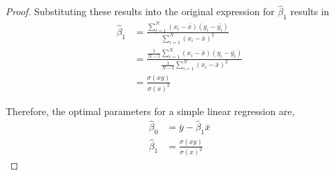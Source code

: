 \begin{proof}
Substituting these results into the original expression for $\hat{\beta}_1$ results in
\begin{align*}
\hat{\beta}_1   &= \frac{\sum_{i=1}^{N}(x_i-\bar{x})(y_i-\bar{y_i})}{\sum_{i=1}^{N}(x_i-\bar{x})^2}\\
    &= \frac{\frac{1}{N-1}\sum_{i=1}^{N}(x_i-\bar{x})(y_i-\bar{y_i})}{\frac{1}{N-1}\sum_{i=1}^{N}(x_i-\bar{x})^2} \\
    &= \frac{\sigma(xy)}{\sigma(x)^2}
\end{align*}

Therefore, the optimal parameters for a simple linear regression are,
\begin{align*}
\hat{\beta}_0   &= \bar{y}-\hat{\beta}_1\bar{x}\\
\hat{\beta}_1   &= \frac{\sigma(xy)}{\sigma(x)^2}
\end{align*}
\end{proof}